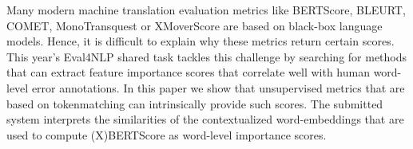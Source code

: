 Many modern machine translation evaluation metrics like BERTScore, BLEURT, COMET, MonoTransquest or XMoverScore are based on black-box language models. Hence, it is difficult to explain why these metrics return certain scores. This year's Eval4NLP shared task tackles this challenge by searching for methods that can extract feature importance scores that correlate well with human word-level error annotations. In this paper we show that unsupervised metrics that are based on tokenmatching can intrinsically provide such scores. The submitted system interprets the similarities of the contextualized word-embeddings that are used to compute (X)BERTScore as word-level importance scores.
